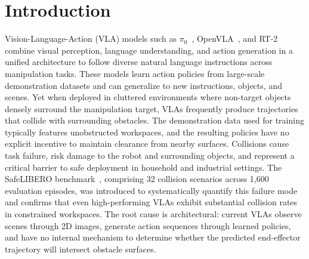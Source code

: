 \section{Introduction}

Vision-Language-Action (VLA) models such as $\pi_0$~\cite{black2024pi0}, OpenVLA~\cite{kim2024openvla}, and RT-2~\cite{brohan2023rt2} combine visual perception, language understanding, and action generation in a unified architecture to follow diverse natural language instructions across manipulation tasks. These models learn action policies from large-scale demonstration datasets and can generalize to new instructions, objects, and scenes. Yet when deployed in cluttered environments where non-target objects densely surround the manipulation target, VLAs frequently produce trajectories that collide with surrounding obstacles. The demonstration data used for training typically features unobstructed workspaces, and the resulting policies have no explicit incentive to maintain clearance from nearby surfaces. Collisions cause task failure, risk damage to the robot and surrounding objects, and represent a critical barrier to safe deployment in household and industrial settings. The SafeLIBERO benchmark~\cite{hu2025vlsa}, comprising 32 collision scenarios across 1,600 evaluation episodes, was introduced to systematically quantify this failure mode and confirms that even high-performing VLAs exhibit substantial collision rates in constrained workspaces. The root cause is architectural: current VLAs observe scenes through 2D images, generate action sequences through learned policies, and have no internal mechanism to determine whether the predicted end-effector trajectory will intersect obstacle surfaces.

